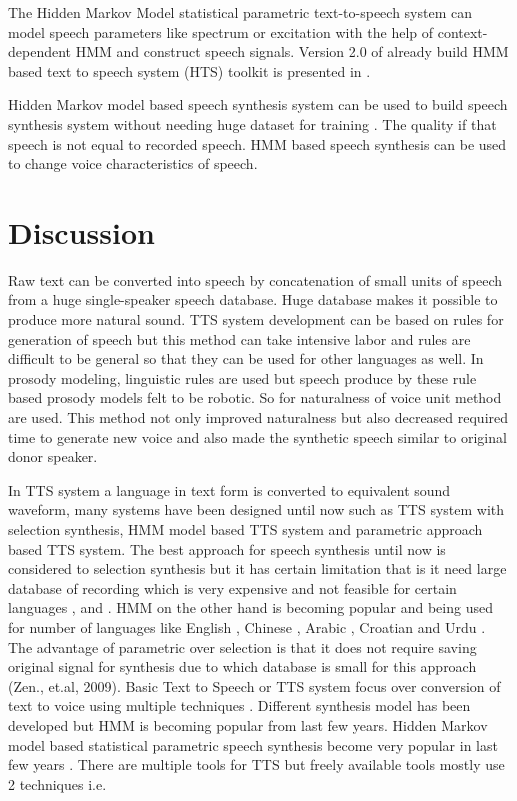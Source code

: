 The Hidden Markov Model statistical parametric text-to-speech system can model speech parameters like spectrum or excitation with the help of context-dependent HMM and construct speech signals. Version 2.0 of already build HMM based text to speech system (HTS) toolkit is presented in \cite{zen2007hmm}.

Hidden Markov model based speech synthesis system can be used to build speech synthesis system without needing huge dataset for training \cite{huang2001spoken}. The quality if that speech is not equal to recorded speech. HMM based speech synthesis can be used to change voice
characteristics of speech. 


\section{Discussion}
Raw text can be converted into speech by concatenation of small units of speech from a huge single-speaker speech database.
Huge database makes it possible to produce more natural sound. TTS system development can be based on rules for
generation of speech but this method can take intensive labor and rules are
difficult to be general so that they can be used for other languages as well. In prosody modeling, linguistic rules are used
\cite{klatt1987review} \cite{pierrehumbert1981synthesizing} but speech produce by these rule based prosody models felt to be robotic. So
for naturalness of voice unit method are used. This method not only improved naturalness but also decreased required time to
generate new voice and also made the synthetic speech similar to original donor speaker.

In TTS system a language in text form is converted to equivalent sound waveform, many systems have been designed until
now such as TTS system with selection synthesis, HMM model based TTS system and parametric approach based TTS
system. The best approach for speech synthesis until now is considered to selection synthesis but it has certain limitation that
is it need large database of recording which is very expensive and not feasible for certain languages \cite{black1994chatr}, \cite{hunt1996unit} and 
\cite{black2003unit}. HMM on the other hand is becoming popular and being used for number of languages like English \cite{tokuda2002hmm}, Chinese \cite{qian2006hmm}, 
Arabic \cite{abdel2006improving}, Croatian \cite{martincic2006croatian} and
Urdu \cite{ahmed2014hmm}. The advantage of parametric over selection is that it does not require saving original signal for
synthesis due to which database is small for this approach (Zen., et.al, 2009). Basic Text to Speech or TTS system focus over
conversion of text to voice using multiple techniques \cite{merritt2013investigating}. Different synthesis model has been
developed but HMM is becoming popular from last few years. Hidden
Markov model based statistical parametric speech synthesis become very popular in last few years \cite{ze2013statistical}. There
are multiple tools for TTS but freely available tools mostly use 2 techniques i.e.

